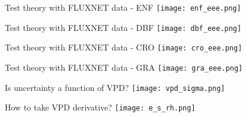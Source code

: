\documentclass[aspectratio=169]{beamer}
\begin{document}
\begin{frame}{Test theory with FLUXNET data - ENF}
  \texttt{[image: enf\_eee.png]}
\end{frame}


\begin{frame}{Test theory with FLUXNET data - DBF}
  \texttt{[image: dbf\_eee.png]}
\end{frame}

\begin{frame}{Test theory with FLUXNET data - CRO}
  \texttt{[image: cro\_eee.png]}
\end{frame}

\begin{frame}{Test theory with FLUXNET data - GRA}
  \texttt{[image: gra\_eee.png]}
\end{frame}

\begin{frame}{Is uncertainty a function of VPD?}
  \texttt{[image: vpd\_sigma.png]}
\end{frame}

\begin{frame}{How to take VPD derivative?}
  \texttt{[image: e\_s\_rh.png]}
\end{frame}







\end{document}
